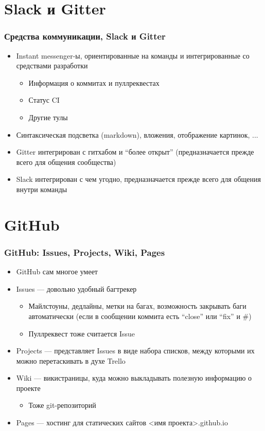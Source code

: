 \documentclass[xetex,mathserif,serif]{beamer}
\begin{document}
    \section{Slack и Gitter}

    \begin{frame}
        \frametitle{Средства коммуникации, Slack и Gitter}
        \begin{itemize}
            \item Instant messenger-ы, ориентированные на команды и интегрированные со средствами разработки
            \begin{itemize}
                \item Информация о коммитах и пуллреквестах
                \item Статус CI
                \item Другие тулы
            \end{itemize}
            \item Синтаксическая подсветка (markdown), вложения, отображение картинок, ...
            \item Gitter интегрирован с гитхабом и ``более открыт'' (предназначается прежде всего для общения сообщества)
            \item Slack интегрирован с чем угодно, предназначается прежде всего для общения внутри команды
        \end{itemize}
    \end{frame}

    \section{GitHub}

    \begin{frame}
        \frametitle{GitHub: Issues, Projects, Wiki, Pages}
        \begin{itemize}
            \item GitHub сам многое умеет
            \item Issues --- довольно удобный багтрекер
            \begin{itemize}
                \item Майлстоуны, дедлайны, метки на багах, возможность закрывать баги автоматически (если в сообщении коммита есть ``close'' или ``fix'' и \#<номер бага>)
                \item Пуллреквест тоже считается Issue
            \end{itemize}
            \item Projects --- представляет Issues в виде набора списков, между которыми их можно перетаскивать в духе Trello
            \item Wiki --- викистраницы, куда можно выкладывать полезную информацию о проекте
            \begin{itemize}
                \item Тоже git-репозиторий
            \end{itemize}
            \item Pages --- хостинг для статических сайтов <имя проекта>.github.io
        \end{itemize}
    \end{frame}
\end{document}
